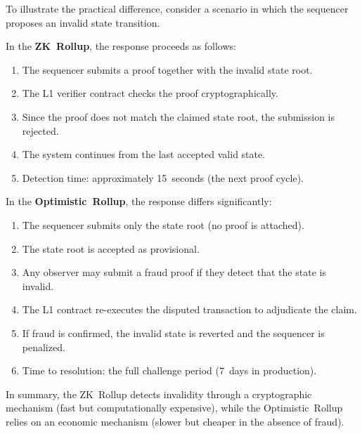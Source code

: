 To illustrate the practical difference, consider a scenario in which the sequencer proposes an invalid state transition.

In the \textbf{ZK~Rollup}, the response proceeds as follows:
\begin{enumerate}
    \item The sequencer submits a proof together with the invalid state root.
    \item The L1 verifier contract checks the proof cryptographically.
    \item Since the proof does not match the claimed state root, the submission is rejected.
    \item The system continues from the last accepted valid state.
    \item Detection time: approximately 15~seconds (the next proof cycle).
\end{enumerate}

In the \textbf{Optimistic~Rollup}, the response differs significantly:
\begin{enumerate}
    \item The sequencer submits only the state root (no proof is attached).
    \item The state root is accepted as provisional.
    \item Any observer may submit a fraud proof if they detect that the state is invalid.
    \item The L1 contract re-executes the disputed transaction to adjudicate the claim.
    \item If fraud is confirmed, the invalid state is reverted and the sequencer is penalized.
    \item Time to resolution: the full challenge period (7~days in production).
\end{enumerate}

In summary, the ZK~Rollup detects invalidity through a cryptographic mechanism (fast but computationally expensive), while the Optimistic~Rollup relies on an economic mechanism (slower but cheaper in the absence of fraud).
